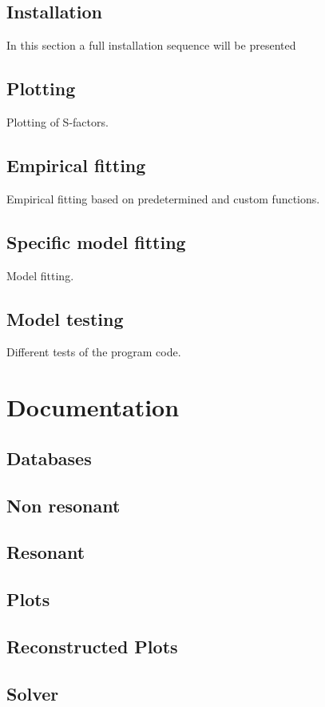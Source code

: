 \documentclass[openany]{book}
\begin{document}
\subsection{Installation}

In this section a full installation sequence will be presented

\subsection{Plotting}

Plotting of S-factors. 

\subsection{Empirical fitting}

Empirical fitting based on predetermined and custom functions.

\subsection{Specific model fitting}

Model fitting.

\subsection{Model testing}

Different tests of the program code. 

\section{Documentation} \label{sec:documentation}

\subsection{Databases}

\subsection{Non resonant}
\subsection{Resonant}
\subsection{Plots}
\subsection{Reconstructed Plots}
\subsection{Solver}

\newpage


\end{document}
